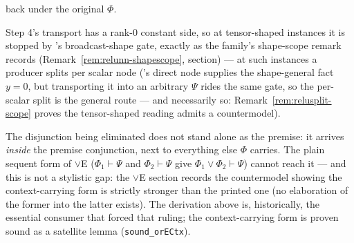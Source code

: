 \begin{brecipe}
\begin{enumerate}
  back under the original $\Phi$.
\end{enumerate}
Step 4's transport has a rank-$0$ constant side, so at tensor-shaped
instances it is stopped by 's broadcast-shape gate,
exactly as the family's shape-scope remark records
(Remark~\ref{rem:relunn-shapescope},  section) ---
at such instances a producer splits per scalar node
('s direct node supplies the shape-general fact
$y = 0$, but transporting it into an arbitrary $\Psi$ rides the same
gate, so the per-scalar split is the general route --- and
necessarily so: Remark~\ref{rem:relusplit-scope} proves the
tensor-shaped reading admits a countermodel).
\end{brecipe}

\begin{bremark}
\label{rem:relusplit-ctxve}
The disjunction being eliminated does not stand alone as the premise:
it arrives \emph{inside} the premise conjunction, next to everything
else $\Phi$ carries. The plain sequent form of $\vee$E ($\Phi_1
\vdash \Psi$ and $\Phi_2 \vdash \Psi$ give $\Phi_1 \vee \Phi_2 \vdash
\Psi$) cannot reach it --- and this is not a stylistic gap: the
$\vee$E section records the countermodel showing the context-carrying
form is strictly stronger than the printed one (no elaboration of the
former into the latter exists). The derivation above is, historically,
the essential consumer that forced that ruling; the
context-carrying form is proven sound as a satellite lemma
(\texttt{sound\_orECtx}).
\end{bremark}

